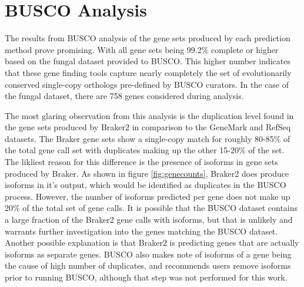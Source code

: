 \section{BUSCO Analysis}

The results from BUSCO analysis of the gene sets produced by each
prediction method prove promising. With all gene sets being 99.2\%
complete or higher based on the fungal dataset provided to BUSCO. This
higher number indicates that these gene finding tools capture nearly
completely the set of evolutionarily conserved single-copy orthologs
pre-defined by BUSCO curators. In the case of the fungal dataset,
there are 758 genes considered during analysis.

The most glaring observation from this analysis is the duplication
level found in the gene sets produced by Braker2 in comparison to the
GeneMark and RefSeq datasets. The Braker gene sets show a single-copy
match for roughly 80-85\% of the total gene call set with duplicates
making up the other 15-20\% of the set. The likliest reason for this
difference is the presence of isoforms in gene sets produced by
Braker. As shown in figure \ref{fig:genecounts}, Braker2 does produce
isoforms in it's output, which would be identified as duplicates in
the BUSCO process. However, the number of isoforms predicted per gene
does not make up 20\% of the total set of gene calls. It is possible
that the BUSCO dataset contains a large fraction of the Braker2 gene
calls with isoforms, but that is unlikely and warrants further
investigation into the genes matching the BUSCO dataset.  Another
possible explanation is that Braker2 is predicting genes that are
actually isoforms as separate genes. BUSCO also makes note of isoforms
of a gene being the cause of high number of duplicates, and recommends
users remove isoforms prior to running BUSCO, although that step was
not performed for this work.



